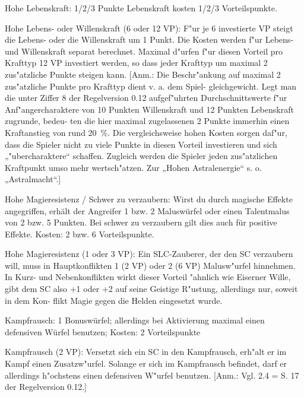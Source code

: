 \begin{description}
\item{Hohe Lebenskraft:} 1/2/3 Punkte Lebenskraft kosten 1/2/3 Vorteilspunkte.

\item{Hohe Lebens- oder Willenskraft (6 oder 12 VP):} F"ur je 6 investierte VP steigt die Lebens- oder die Willenskraft um 1 Punkt. Die Kosten werden f"ur Lebens- und Willenskraft separat berechnet. Maximal d"urfen f"ur diesen Vorteil pro Krafttyp 12 VP investiert werden, so dass jeder Krafttyp um maximal 2 zus"atzliche Punkte steigen kann. [Anm.: Die Beschr"ankung auf maximal 2 zus"atzliche Punkte pro Krafttyp dient v. a. dem Spiel- gleichgewicht. Legt man die unter Ziffer 8 der Regelversion 0.12 aufgef"uhrten Durchschnittswerte f"ur Anf"angercharaktere von 10 Punkten Willenskraft und 12 Punkten Lebenskraft zugrunde, bedeu- ten die hier maximal zugelassenen 2 Punkte immerhin einen Kraftanstieg von rund 20~\%. Die vergleichsweise hohen Kosten sorgen daf"ur, dass die Spieler nicht zu viele Punkte in diesen Vorteil investieren und sich „"ubercharaktere“ schaffen. Zugleich werden die Spieler jeden zus"atzlichen Kraftpunkt umso mehr wertsch"atzen. Zur „Hohen Astralenergie“ s. o. „Astralmacht“.]

\item{Hohe Magieresistenz / Schwer zu verzaubern:} Wirst du durch magische Effekte angegriffen, erhält der Angreifer 1 bzw. 2 Maluswürfel oder einen Talentmalus von 2 bzw. 5 Punkten. Bei schwer zu verzaubern gilt dies auch für positive Effekte. Kosten: 2 bzw. 6 Vorteilspunkte.

\item{Hohe Magieresistenz (1 oder 3 VP):} Ein SLC-Zauberer, der den SC verzaubern will, muss in Hauptkonflikten 1 (2 VP) oder 2 (6 VP) Malusw"urfel hinnehmen. In Kurz- und Nebenkonflikten wirkt dieser Vorteil "ahnlich wie Eiserner Wille, gibt dem SC also +1 oder +2 auf seine Geistige R"ustung, allerdings nur, soweit in dem Kon- flikt Magie gegen die Helden eingesetzt wurde.

\item{Kampfrausch:} 1 Bonuswürfel; allerdings bei Aktivierung maximal einen defensiven Würfel benutzen; Kosten: 2 Vorteilspunkte

\item{Kampfrausch (2 VP):}
Versetzt sich ein SC in den Kampfrausch, erh"alt er im Kampf einen Zusatzw"urfel. Solange er sich im Kampfrausch befindet, darf er allerdings h"ochstens einen defensiven W"urfel benutzen. [Anm.: Vgl. 2.4 = S. 17 der Regelversion 0.12.]


\end{description}
